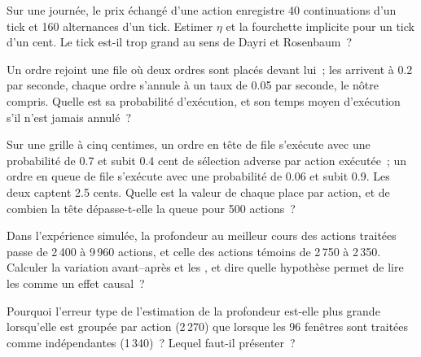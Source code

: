 \begin{exercise}[$\star$]\label{exo:mx:tick-size-queues-and-priority:2}
Sur une journée, le prix échangé d'une action enregistre 40 continuations d'un tick et 160 alternances d'un tick. Estimer $\eta$ et la fourchette implicite pour un
tick d'un cent. Le tick est-il trop grand au sens de Dayri et Rosenbaum~?
\end{exercise}

\begin{exercise}[$\star$]\label{exo:mx:tick-size-queues-and-priority:3}
Un ordre rejoint une file où deux ordres sont placés devant lui~; les  arrivent à 0.2 par seconde, chaque ordre s'annule à un taux de 0.05 par seconde, le nôtre compris. Quelle est sa
probabilité d'exécution, et son temps moyen d'exécution s'il n'est jamais annulé~?
\end{exercise}

\begin{exercise}[$\star\star$]\label{exo:mx:tick-size-queues-and-priority:4}
Sur une grille à cinq centimes, un ordre en tête de file s'exécute avec une probabilité de 0.7 et subit 0.4 cent de sélection adverse par action exécutée~; un ordre en queue de file s'exécute
avec une probabilité de 0.06 et subit 0.9. Les deux captent 2.5 cents. Quelle est la valeur de chaque place par action, et de combien la tête dépasse-t-elle la queue pour 500 actions~?
\end{exercise}

\begin{exercise}[$\star\star$]\label{exo:mx:tick-size-queues-and-priority:5}
Dans l'expérience simulée, la profondeur au meilleur cours des actions traitées passe de 2\,400 à 9\,960 actions, et celle des actions témoins de 2\,750 à 2\,350. Calculer la
variation avant--après et les , et dire quelle hypothèse permet de lire les  comme un effet causal~?
\end{exercise}

\begin{exercise}[$\star\star$]\label{exo:mx:tick-size-queues-and-priority:6}
Pourquoi l'erreur type de l'estimation de la profondeur est-elle plus grande lorsqu'elle est groupée par action (2\,270) que lorsque les 96 fenêtres sont traitées comme indépendantes (1\,340)~?
Lequel faut-il présenter~?
\end{exercise}

